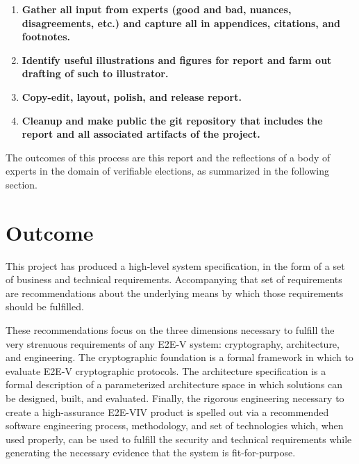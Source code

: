 \begin{enumerate}
{    feasibility of Part 2 potential recommendations.}
\item \textbf{Gather all input from experts (good and bad, nuances,
    disagreements, etc.) and capture all in appendices, citations, and
    footnotes.}
\item \textbf{Identify useful illustrations and figures for report and
    farm out drafting of such to illustrator.}
\item \textbf{Copy-edit, layout, polish, and release report.}
\item \textbf{Cleanup and make public the git repository that includes
  the report and all associated artifacts of the project.}
\end{enumerate}

The outcomes of this process are this report and the reflections of a
body of experts in the domain of verifiable elections, as summarized
in the following section.

\section{Outcome}
\label{sec:outcome}

This project has produced a high-level system specification, in the
form of a set of business and technical requirements.  Accompanying
that set of requirements are recommendations about the underlying
means by which those requirements should be fulfilled.  

These recommendations focus on the three dimensions necessary to
fulfill the very strenuous requirements of any E2E-V system:
cryptography, architecture, and engineering.  The cryptographic
foundation is a formal framework in which to evaluate E2E-V
cryptographic protocols.  The architecture specification is a formal
description of a parameterized architecture space in which solutions
can be designed, built, and evaluated.  Finally, the rigorous
engineering necessary to create a high-assurance E2E-VIV product is
spelled out via a recommended software engineering process,
methodology, and set of technologies which, when used properly, can be
used to fulfill the security and  technical requirements
while generating the necessary evidence that the system is
fit-for-purpose.

